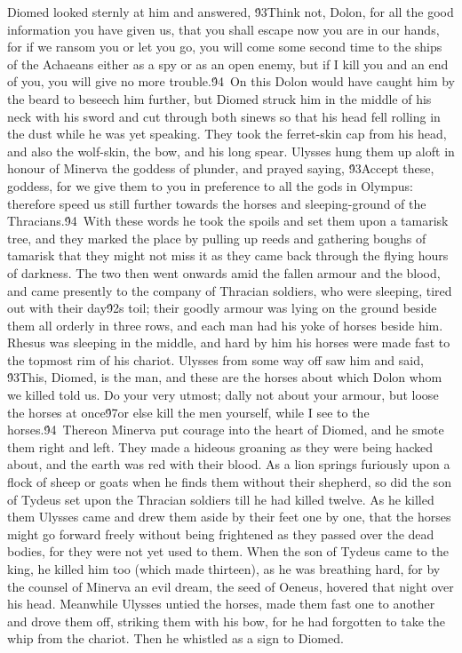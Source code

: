 {Diomed looked sternly at him and answered, \'93Think not, Dolon, for all the good information you have given us, that you shall escape now you are in our hands, for if we ransom you or let you go, you will come some second time to the ships of the Achaeans either as a spy or as an open enemy, but if I kill you and an end of you, you will give no more trouble.\'94\
On this Dolon would have caught him by the beard to beseech him further, but Diomed struck him in the middle of his neck with his sword and cut through both sinews so that his head fell rolling in the dust while he was yet speaking. They took the ferret-skin cap from his head, and also the wolf-skin, the bow, and his long spear. Ulysses hung them up aloft in honour of Minerva the goddess of plunder, and prayed saying, \'93Accept these, goddess, for we give them to you in preference to all the gods in Olympus: therefore speed us still further towards the horses and sleeping-ground of the Thracians.\'94\
With these words he took the spoils and set them upon a tamarisk tree, and they marked the place by pulling up reeds and gathering boughs of tamarisk that they might not miss it as they came back through the flying hours of darkness. The two then went onwards amid the fallen armour and the blood, and came presently to the company of Thracian soldiers, who were sleeping, tired out with their day\'92s toil; their goodly armour was lying on the ground beside them all orderly in three rows, and each man had his yoke of horses beside him. Rhesus was sleeping in the middle, and hard by him his horses were made fast to the topmost rim of his chariot. Ulysses from some way off saw him and said, \'93This, Diomed, is the man, and these are the horses about which Dolon whom we killed told us. Do your very utmost; dally not about your armour, but loose the horses at once\'97or else kill the men yourself, while I see to the horses.\'94\
Thereon Minerva put courage into the heart of Diomed, and he smote them right and left. They made a hideous groaning as they were being hacked about, and the earth was red with their blood. As a lion springs furiously upon a flock of sheep or goats when he finds them without their shepherd, so did the son of Tydeus set upon the Thracian soldiers till he had killed twelve. As he killed them Ulysses came and drew them aside by their feet one by one, that the horses might go forward freely without being frightened as they passed over the dead bodies, for they were not yet used to them. When the son of Tydeus came to the king, he killed him too (which made thirteen), as he was breathing hard, for by the counsel of Minerva an evil dream, the seed of Oeneus, hovered that night over his head. Meanwhile Ulysses untied the horses, made them fast one to another and drove them off, striking them with his bow, for he had forgotten to take the whip from the chariot. Then he whistled as a sign to Diomed.\
}
